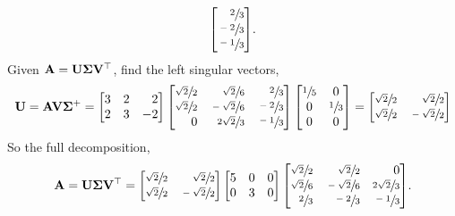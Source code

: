 \documentclass[11pt]{article}
\begin{document}
\begin{enumerate}
\[              \begin{bmatrix*}[r]
                  \sfrac{2}{3} \\ \sfrac{-2}{3} \\ \sfrac{-1}{3}
              \end{bmatrix*} \! .
          \]
          Given $\mathbf{A} = \mathbf{U} \mathbf{\Sigma} \mathbf{V}^\top$, find the left singular vectors,
          \[
              \mat{U} = \mat{A} \mat{V} \mat{\Sigma}^+ =
              \begin{bmatrix*}[r]
                  3 & 2 & 2 \\
                  2 & 3 & -2 \\
              \end{bmatrix*}
              \begin{bmatrix*}[r]
                  \sfrac{\sqrt{2}}{2} & \sfrac{\sqrt{2}}{6}  & \sfrac{2}{3}  \\
                  \sfrac{\sqrt{2}}{2} & \sfrac{-\sqrt{2}}{6} & \sfrac{-2}{3} \\
                  0                   & \sfrac{2\sqrt{2}}{3} & \sfrac{-1}{3} \\
              \end{bmatrix*}
              \begin{bmatrix*}[c]
                  \sfrac{1}{5} & 0 \\
                  0 & \sfrac{1}{3} \\
                  0 & 0 \\
              \end{bmatrix*}
              =
              \begin{bmatrix*}[r]
                  \sfrac{\sqrt{2}}{2} & \sfrac{\sqrt{2}}{2} \\
                  \sfrac{\sqrt{2}}{2} & \sfrac{-\sqrt{2}}{2} \\
              \end{bmatrix*}
          \]
          So the full decomposition,
          \[
              \mat{A} = \mat{U} \mat{\Sigma} \mat{V}^\top =
              \begin{bmatrix*}[r]
                  \sfrac{\sqrt{2}}{2} & \sfrac{\sqrt{2}}{2} \\
                  \sfrac{\sqrt{2}}{2} & \sfrac{-\sqrt{2}}{2} \\
              \end{bmatrix*}
              \begin{bmatrix}
                  5 & 0 & 0 \\
                  0 & 3 & 0 \\
              \end{bmatrix}
              \begin{bmatrix*}[r]
                  \sfrac{\sqrt{2}}{2} & \sfrac{\sqrt{2}}{2}  & 0 \\
                  \sfrac{\sqrt{2}}{6} & \sfrac{-\sqrt{2}}{6} & \sfrac{2\sqrt{2}}{3} \\
                  \sfrac{2}{3}        & \sfrac{-2}{3}        & \sfrac{-1}{3} \\
              \end{bmatrix*}
              \! .
          \]


\end{enumerate}
\end{document}
